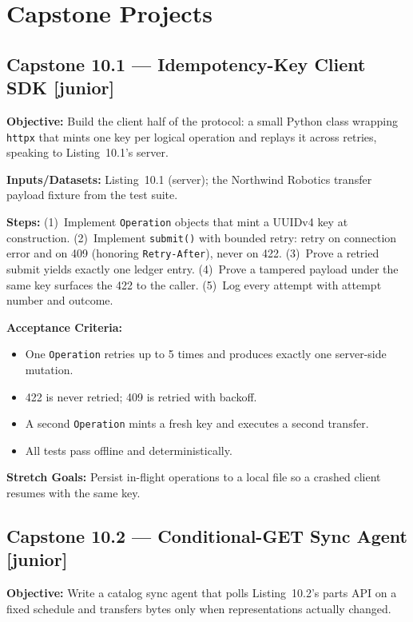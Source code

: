 \section{Capstone Projects}
\label{sec:ch10-capstones}

\subsection*{Capstone 10.1 --- Idempotency-Key Client SDK \hfill [junior]}
\textbf{Objective:} Build the client half of the protocol: a small Python
class wrapping \texttt{httpx} that mints one key per logical operation and
replays it across retries, speaking to Listing~10.1's server.

\textbf{Inputs/Datasets:} Listing~10.1 (server); the Northwind Robotics
transfer payload fixture from the test suite.

\textbf{Steps:} (1)~Implement \texttt{Operation} objects that mint a UUIDv4
key at construction. (2)~Implement \texttt{submit()} with bounded retry:
retry on connection error and on 409 (honoring \texttt{Retry-After}),
never on 422. (3)~Prove a retried submit yields exactly one ledger entry.
(4)~Prove a tampered payload under the same key surfaces the 422 to the
caller. (5)~Log every attempt with attempt number and outcome.

\textbf{Acceptance Criteria:}
\begin{itemize}
  \item[$\square$] One \texttt{Operation} retries up to 5 times and produces
        exactly one server-side mutation.
  \item[$\square$] 422 is never retried; 409 is retried with backoff.
  \item[$\square$] A second \texttt{Operation} mints a fresh key and
        executes a second transfer.
  \item[$\square$] All tests pass offline and deterministically.
\end{itemize}

\textbf{Stretch Goals:} Persist in-flight operations to a local file so a
crashed client resumes with the same key.

\subsection*{Capstone 10.2 --- Conditional-GET Sync Agent \hfill [junior]}
\textbf{Objective:} Write a catalog sync agent that polls
Listing~10.2's parts API on a fixed schedule and transfers bytes only when
representations actually changed.

